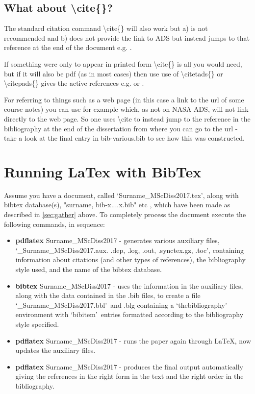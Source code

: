 \documentclass[twoside, fontsize=12pt,
     bibliography=totoc, %
     listof=totoc, %
     index=totoc, %
     onehalfspacing %
]{_MScDiss2017_cls}
\begin{document}
\subsection{What about \textbackslash cite\{\}?} 
\label{subsec;cite}
The standard citation command \textbackslash cite\{\} will also work but a) is not recommended and b) does not provide the link to ADS but instead jumps to that reference at the end of the document e.g. \cite{1993dca..book....9W}. 

If something were only to appear in printed form \textbackslash cite\{\} is all you would need, but if it will also be pdf (as in most cases) then use use of  \textbackslash citetads\{\}  or \textbackslash citepads\{\}  gives the active references e.g.  or .

For referring to things such as a web page (in this case a link to the url of some course notes) you can use for example  \cite{QMULExtrasolarPlanetlecturenotes} which, as not on NASA ADS, will not link directly to the web page. So one uses \textbackslash cite to instead jump to the reference in the bibliography at the end of the dissertation from where you can go to the url - take a look at the final entry in bib-various.bib to see how this was constructed.

\section{Running LaTex with BibTex}
\label{sec:running}
Assume you have a document, called \lq Surname\_MScDiss2017.tex\rq , along with bibtex database(s), "surname, bib-x....x.bib" etc , which have been made as described in \ref{sec:gather} above. To completely process the document execute the following commands, in sequence:

\begin{itemize}{}
\item {\normalfont\bfseries pdflatex} Surname\_MScDiss2017  - generates various auxiliary files, 
\newline \lq \_Surname\_MScDiss2017.aux. .dep, .log, .out, .synctex.gz, .toc\rq , containing information about citations (and other types of references), the bibliography style used, and the name of the bibtex database. 
\item {\normalfont\bfseries bibtex} Surname\_MScDiss2017  - uses the information in the auxiliary files, along with the data contained in the .bib files, to create a file\\ \lq \_Surname\_MScDiss2017.bbl\rq\, and .blg containing a \lq thebibliography\rq\, environment with \lq bibitem\rq\, entries formatted according to the bibliography style specified.
\item {\normalfont\bfseries pdflatex}  Surname\_MScDiss2017 - runs  the paper again through LaTeX, now updates the auxiliary files.
\item {\normalfont\bfseries pdflatex}  Surname\_MScDiss2017 - produces the final  output automatically giving the references in the right form in the text and the right order in the bibliography. 
\end{itemize}
\end{document}
